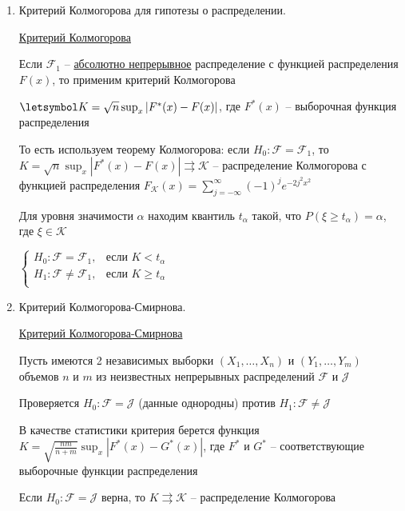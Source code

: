 \begin{enumerate}
    \item Критерий Колмогорова для гипотезы о распределении.

    \hyperlink{kolmogorovs_criterion}{Критерий Колмогорова}

    Если $\mathcal{F}_1$ -- \underline{абсолютно непрерывное} распределение с функцией распределения $F(x)$, то применим критерий Колмогорова

    $\letsymbol K = \sqrt{n} \sup_x |F^*(x) - F(x)|$, где $F^*(x)$ -- выборочная функция распределения

    То есть используем теорему Колмогорова: если $H_0 : \mathcal{F} = \mathcal{F}_1$, то $K =\sqrt{n} \sup_x |F^*(x) - F(x)| 
    \rightrightarrows \mathcal{K}$ -- распределение Колмогорова 
    с функцией распределения $F_\mathcal{K}(x) = \sum_{j = -\infty}^\infty (-1)^j e^{-2j^2 x^2}$

    Для уровня значимости $\alpha$ находим квантиль $t_\alpha$ такой, что $P(\xi \geq t_\alpha) = \alpha$, 
    где $\xi \in \mathcal{K}$

    $\begin{cases}
        H_0 : \mathcal{F} = \mathcal{F}_1, & \text{если } K < t_\alpha \\
        H_1 : \mathcal{F} \neq \mathcal{F}_1, & \text{если } K \geq t_\alpha \\
    \end{cases}$

    \item Критерий Колмогорова-Смирнова.

    \hyperlink{kolmogorovs_smirnovs_criterion}{Критерий Колмогорова-Смирнова}

    Пусть имеются 2 независимых выборки $(X_1, \dots, X_n)$ и $(Y_1, \dots, Y_m)$ объемов $n$ и $m$ из неизвестных непрерывных распределений $\mathcal{F}$ и $\mathcal{J}$

    Проверяется $H_0 : \mathcal{F} = \mathcal{J}$ (данные однородны) против $H_1 : \mathcal{F} \neq \mathcal{J}$

    В качестве статистики критерия берется функция $K = \sqrt{\frac{nm}{n + m}} \sup_x |F^*(x) - G^*(x)|$, где $F^*$ и $G^*$ -- 
    соответствующие выборочные функции распределения

    \begin{MyTheorem}

        Если $H_0 : \mathcal{F} = \mathcal{J}$ верна, то $K \rightrightarrows \mathcal{K}$ -- распределение Колмогорова
    \end{MyTheorem}


\end{enumerate}
